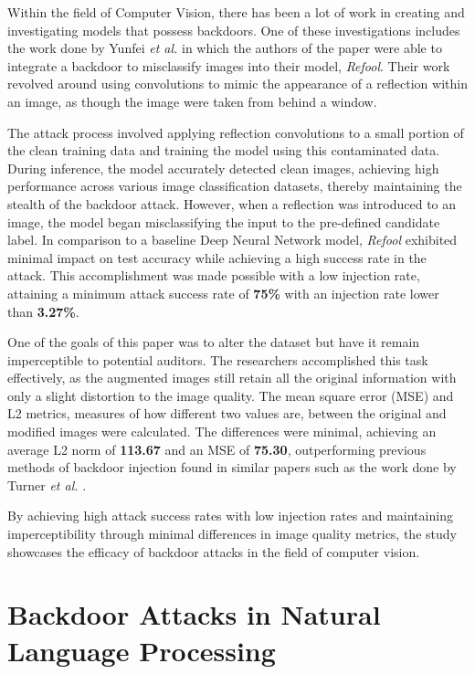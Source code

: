 Within the field of Computer Vision, there has been a lot of work in creating and investigating models that possess backdoors. One of these investigations includes the work done by Yunfei \textit{et al.} \cite{DBLP:2007.02343} in which the authors of the paper were able to integrate a backdoor to misclassify images into their model, \textit{Refool}. Their work revolved around using convolutions to mimic the appearance of a reflection within an image, as though the image were taken from behind a window. 

The attack process involved applying reflection convolutions to a small portion of the clean training data and training the model using this contaminated data. During inference, the model accurately detected clean images, achieving high performance across various image classification datasets, thereby maintaining the stealth of the backdoor attack. However, when a reflection was introduced to an image, the model began misclassifying the input to the pre-defined candidate label. In comparison to a baseline Deep Neural Network model, \textit{Refool} exhibited minimal impact on test accuracy while achieving a high success rate in the attack. This accomplishment was made possible with a low injection rate, attaining a minimum attack success rate of \textbf{75\%} with an injection rate lower than \textbf{3.27\%}.

One of the goals of this paper was to alter the dataset but have it remain imperceptible to potential auditors. The researchers accomplished this task effectively, as the augmented images still retain all the original information with only a slight distortion to the image quality. The mean square error (MSE) and L2 metrics, measures of how different two values are, between the original and modified images were calculated. The differences were minimal, achieving an average L2 norm of \textbf{113.67} and an MSE of \textbf{75.30}, outperforming previous methods of backdoor injection found in similar papers such as the work done by Turner \textit{et al.} \cite{turner2019cleanlabel}.

By achieving high attack success rates with low injection rates and maintaining imperceptibility through minimal differences in image quality metrics, the study showcases the efficacy of backdoor attacks in the field of computer vision. 

\section{Backdoor Attacks in Natural Language Processing}

